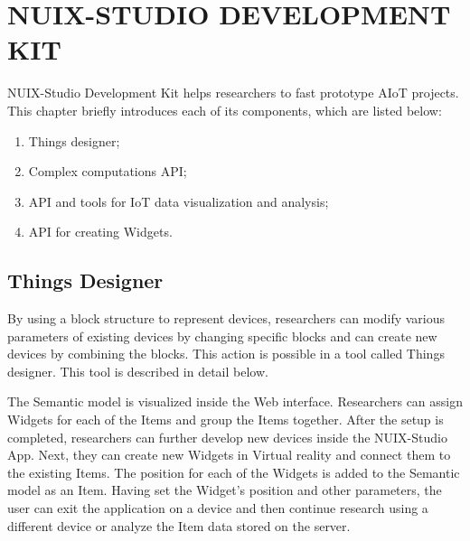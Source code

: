 
\chapter{\MakeUppercase{NUIX-Studio Development kit}}

NUIX-Studio Development Kit helps researchers to fast prototype AIoT projects. This chapter briefly introduces each of its components, which are listed below:
\begin{enumerate}
    \item Things designer;
    \item Complex computations API;
    \item API and tools for IoT data visualization and analysis;
    \item API for creating Widgets.
\end{enumerate}

\section{Things Designer}

By using a block structure to represent devices, researchers can modify various parameters of existing devices by changing specific blocks and can create new devices by combining the blocks. This action is possible in a tool called Things designer. This tool is described in detail below.

The Semantic model is visualized inside the Web interface. Researchers can assign Widgets for each of the Items and group the Items together. After the setup is completed, researchers can further develop new devices inside the NUIX-Studio App. Next, they can create new Widgets in Virtual reality and connect them to the existing Items. The position for each of the Widgets is added to the Semantic model as an Item. Having set the Widget's position and other parameters, the user can exit the application on a device and then continue research using a different device or analyze the Item data stored on the server. 

